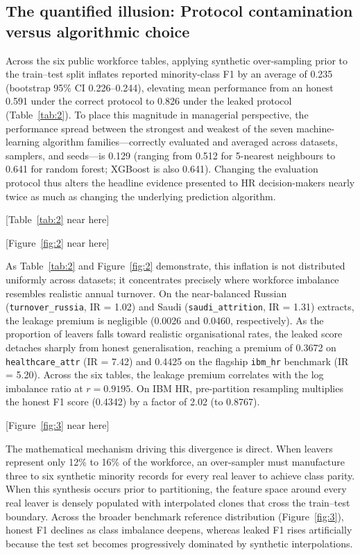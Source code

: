 \documentclass[12pt,a4paper]{article}
\begin{document}
\subsection{The quantified illusion: Protocol contamination versus algorithmic choice}
Across the six public workforce tables, applying synthetic over-sampling prior to the train--test split inflates reported minority-class F1 by an average of 0.235 (bootstrap 95\% CI 0.226--0.244), elevating mean performance from an honest 0.591 under the correct protocol to 0.826 under the leaked protocol (Table~\ref{tab:2}). To place this magnitude in managerial perspective, the performance spread between the strongest and weakest of the seven machine-learning algorithm families---correctly evaluated and averaged across datasets, samplers, and seeds---is 0.129 (ranging from 0.512 for 5-nearest neighbours to 0.641 for random forest; XGBoost is also 0.641). Changing the evaluation protocol thus alters the headline evidence presented to HR decision-makers nearly twice as much as changing the underlying prediction algorithm.

\begin{center}
[Table~\ref{tab:2} near here]
\end{center}

\begin{center}
[Figure~\ref{fig:2} near here]
\end{center}

As Table~\ref{tab:2} and Figure~\ref{fig:2} demonstrate, this inflation is not distributed uniformly across datasets; it concentrates precisely where workforce imbalance resembles realistic annual turnover. On the near-balanced Russian (\texttt{turnover\_russia}, IR = 1.02) and Saudi (\texttt{saudi\_attrition}, IR = 1.31) extracts, the leakage premium is negligible (0.0026 and 0.0460, respectively). As the proportion of leavers falls toward realistic organisational rates, the leaked score detaches sharply from honest generalisation, reaching a premium of 0.3672 on \texttt{healthcare\_attr} (IR = 7.42) and 0.4425 on the flagship \texttt{ibm\_hr} benchmark (IR = 5.20). Across the six tables, the leakage premium correlates with the log imbalance ratio at $r = 0.9195$. On IBM HR, pre-partition resampling multiplies the honest F1 score (0.4342) by a factor of 2.02 (to 0.8767).

\begin{center}
[Figure~\ref{fig:3} near here]
\end{center}

The mathematical mechanism driving this divergence is direct. When leavers represent only 12\% to 16\% of the workforce, an over-sampler must manufacture three to six synthetic minority records for every real leaver to achieve class parity. When this synthesis occurs prior to partitioning, the feature space around every real leaver is densely populated with interpolated clones that cross the train--test boundary. Across the broader benchmark reference distribution (Figure~\ref{fig:3}), honest F1 declines as class imbalance deepens, whereas leaked F1 rises artificially because the test set becomes progressively dominated by synthetic interpolations.
\end{document}

